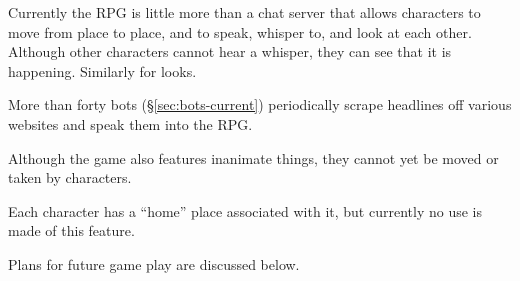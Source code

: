 Currently the RPG is little more than a chat server that allows characters to
move from place to place, and to speak, whisper to, and look at each other.
Although other characters cannot hear a whisper, they can see that it is
happening.
Similarly for looks.

More than forty bots (\S\ref{sec:bots-current}) periodically
scrape headlines off various websites and speak them into the RPG\@.

Although the game also features inanimate things, they cannot yet be moved
or taken by characters.

Each character has a ``home'' place associated with it, but currently no use is
made of this feature.

Plans for future game play are discussed below.
